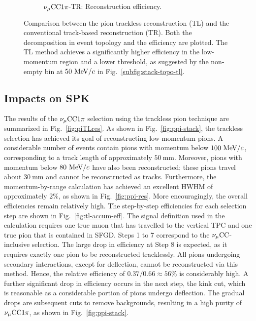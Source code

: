 \begin{figure}
\begin{subfigure}{\dbfigwid\textwidth}
                    \caption{$\nu_{\mu}\textrm{CC}1\pi$-TR: Reconstruction efficiency.}
                    \label{subfig:ppi-eff-tr}
               \end{subfigure}
              \caption{Comparison between the pion trackless reconstruction (TL) and the conventional track-based reconstruction (TR). Both the decomposition in event topology and the efficiency are plotted. The TL method achieves a significantly higher efficiency in the low-momentum region and a lower threshold, as suggested by the non-empty bin at $50~\textrm{MeV}/c$ in Fig.~\ref{subfig:stack-topo-tl}.}
               \label{fig:tltr-comp}
            \end{figure}


     \subsection{Impacts on SPK}
          The results of the $\nu_{\mu}\textrm{CC}1\pi$ selection using the trackless pion technique are summarized in Fig.~\ref{fig:piTLres}.
          As shown in Fig.~\ref{fig:ppi-stack}, the trackless selection has achieved its goal of reconstructing low-momentum pions.
          A considerable number of events contain pions with momentum below $100~\textrm{MeV}/c$, corresponding to a track length of approximately $50~\textrm{mm}$.
          Moreover, pions with momentum below $80~\textrm{MeV}/c$ have also been reconstructed; these pions travel about $30~\textrm{mm}$ and cannot be reconstructed as tracks.
          Furthermore, the momentum-by-range calculation has achieved an excellent HWHM of approximately $2\%$, as shown in Fig.~\ref{fig:ppi-res}.
          More encouragingly, the overall efficiencies remain relatively high.
          The step-by-step efficiencies for each selection step are shown in Fig.~\ref{fig:tl-accum-eff}.
          The signal definition used in the calculation requires one true muon that has travelled to the vertical TPC and one true pion that is contained in SFGD.
          Steps 1 to 7 correspond to the $\nu_{\mu}\textrm{CC}$-inclusive selection.
          The large drop in efficiency at Step 8 is expected, as it requires exactly one pion to be reconstructed tracklessly.
          All pions undergoing secondary interactions, except for deflection, cannot be reconstructed via this method.
          Hence, the relative efficiency of $0.37/0.66\approx56\%$ is considerably high.
          A further significant drop in efficiency occurs in the next step, the kink cut, which is reasonable as a considerable portion of pions undergo deflection.
          The gradual drops are subsequent cuts to remove backgrounds, resulting in a high purity of $\nu_{\mu}\textrm{CC}1\pi$, as shown in Fig.~\ref{fig:ppi-stack}.

